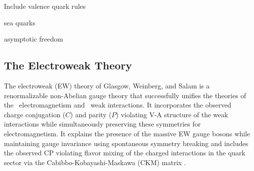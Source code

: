 Include valence quark rules

sea quarks

asymptotic freedom

\subsection{The Electroweak Theory}
\label{sec:theory_ew}
The electroweak (EW) 
theory of Glasgow, Weinberg, and 
Salam \cite{glashow:1961tr,Salam:1968rm,weinberg:1967tq}
is a renormalizable \cite{hooft1971renormalization,Hooft1971167}
non-Abelian gauge theory 
that successfully unifies the theories 
of the \uone~electromagnetism and \sutwo~weak interactions.
It incorporates the observed 
charge conjugation ($C$) 
and parity ($P$) violating V-A structure of the weak interactions
\cite{PhysRev.105.1413,Garwin:1957hc,PhysRev.106.1290}
while simultaneously preserving these symmetries for electromagnetism.
It explains the presence of the massive EW gauge bosons 
while maintaining gauge invariance
using spontaneous symmetry breaking
and includes the observed CP violating 
\cite{PhysRevLett.13.138} 
flavor mixing of the 
charged interactions in the quark sector via 
the Cabibbo-Kobayashi-Maskawa  (CKM)
matrix \cite{Cabibbo:1963yz,Kobayashi:1973fv}.

